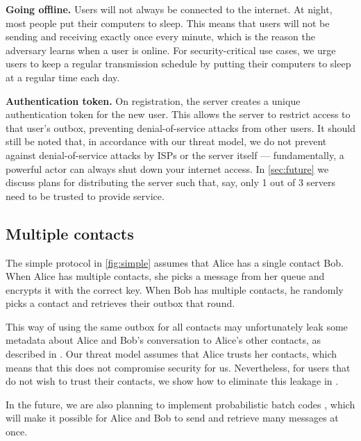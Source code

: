
\textbf{Going offline.} Users will not always be connected to the internet. At night, most people put their computers to sleep. This means that users will not be sending and receiving exactly once every minute, which is the reason the adversary learns when a user is online. For security-critical use cases, we urge users to keep a regular transmission schedule by putting their computers to sleep at a regular time each day.

\textbf{Authentication token.} 
On registration, the server creates a unique authentication token for the new user. This allows the server to restrict access to that user's outbox, preventing denial-of-service attacks from other users. It should still be noted that, in accordance with our threat model, we do not prevent against denial-of-service attacks by ISPs or the server itself — fundamentally, a powerful actor can always shut down your internet access. In \cref{sec:future} we discuss plans for distributing the server such that, say, only 1 out of 3 servers need to be trusted to provide service. 

\subsection{Multiple contacts}

The simple protocol in \cref{fig:simple} assumes that Alice has a single contact Bob. When Alice has multiple contacts, she picks a message from her queue and encrypts it with the correct key. When Bob has multiple contacts, he randomly picks a contact and retrieves their outbox that round. 

This way of using the same outbox for all contacts may unfortunately leak some metadata about Alice and Bob's conversation to Alice's other contacts, as described in \cite{angel2018s}. Our threat model assumes that Alice trusts her contacts, which means that this does not compromise security for us. Nevertheless, for users that do not wish to trust their contacts, we show how to eliminate this leakage in \cite{LAZ22SecDef}.

In the future, we are also planning to implement probabilistic batch codes \cite{angel2018pir}, which will make it possible for Alice and Bob to send and retrieve many messages at once.

